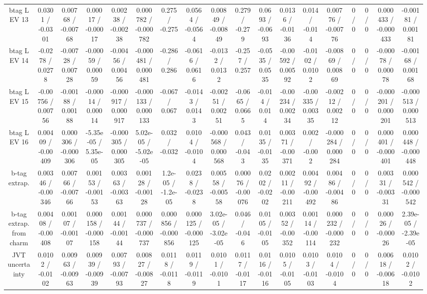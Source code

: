 \documentclass[10pt]{article}
\begin{document}
\begin{table}[htbp]
\begin{center}
\begin{tabular}{|c|c|c|c|c|c|c|c|c|c|c|c|c|c|c|c|c|c|}
  btag L EV 13 & 0.0301 / -0.0301 & 0.00768 / -0.00768 & 0.00017 / -0.00017 & 0.00238 / -0.00238 & 0.000782 / -0.000782 & 0.275 / -0.275 & 0.0564 / -0.0564 & 0.00849 / -0.00849 & 0.279 / -0.279 & 0.0693 / -0.0693 & 0.0136 / -0.0136 & 0.014 / -0.014 & 0.00776 / -0.00776 & 0 / 0 & 0 / 0 & 0.000433 / -0.000433 & -0.00181 / 0.00181 \\ 
  btag L EV 14 & -0.0278 / 0.0278 & -0.00728 / 0.00728 & -0.00059 / 0.00059 & -0.00456 / 0.00456 & -0.000481 / 0.000481 & -0.286 / 0.286 & -0.0616 / 0.0616 & -0.0132 / 0.0132 & -0.257 / 0.257 & -0.0535 / 0.0535 & -0.00592 / 0.00592 & -0.0102 / 0.0102 & -0.00869 / 0.00869 & 0 / 0 & 0 / 0 & -0.00078 / 0.00078 & -0.00168 / 0.00168 \\ 
  btag L EV 15 & -0.00756 / 0.00756 & -0.00188 / 0.00188 & -0.00014 / 0.00014 & -0.000917 / 0.000917 & -0.000133 / 0.000133 & -0.067 / 0.067 & -0.0143 / 0.0143 & -0.00251 / 0.00251 & -0.0665 / 0.0665 & -0.014 / 0.014 & -0.00234 / 0.00234 & -0.00335 / 0.00335 & -0.00212 / 0.00212 & 0 / 0 & 0 / 0 & -0.000201 / 0.000201 & -0.000513 / 0.000513 \\ 
  btag L EV 16 & 0.00409 / -0.00409 & 0.000306 / -0.000306 & -5.35e-05 / 5.35e-05 & -0.000305 / 0.000305 & 5.02e-05 / -5.02e-05 & 0.032 / -0.032 & 0.0104 / -0.0104 & -0.000568 / 0.000568 & 0.043 / -0.043 & 0.0135 / -0.0135 & 0.00371 / -0.00371 & 0.002 / -0.002 & -0.000284 / 0.000284 & 0 / 0 & 0 / 0 & 0.000401 / -0.000401 & 0.000448 / -0.000448 \\ 
  b-tag extrap. & 0.00346 / -0.00346 & 0.00766 / -0.00766 & 0.00153 / -0.00153 & 0.00363 / -0.00363 & 0.00128 / -0.00128 & 1.2e-05 / -1.2e-05 & 0.0238 / -0.0238 & 0.00558 / -0.00558 & 0.00076 / -0.00076 & 0.0202 / -0.0202 & 0.00211 / -0.00211 & 0.00492 / -0.00492 & 0.00486 / -0.00486 & 0 / 0 & 0 / 0 & 0.00331 / -0.00331 & 0.000542 / -0.000542 \\ 
  b-tag extrap. from charm & 0.00408 / -0.00408 & 0.00107 / -0.00107 & 0.000158 / -0.000158 & 0.00144 / -0.00144 & 0.000737 / -0.000737 & 0.000856 / -0.000856 & 0.000125 / -0.000125 & 3.02e-05 / -3.02e-05 & 0.046 / -0.046 & 0.0105 / -0.0105 & 0.00352 / -0.00352 & 0.00114 / -0.00114 & 0.000232 / -0.000232 & 0 / 0 & 0 / 0 & 0.00026 / -0.00026 & 2.39e-05 / -2.39e-05 \\ 
  JVT uncertainty & 0.0102 / -0.0102 & 0.00963 / -0.00963 & 0.00939 / -0.00939 & 0.00793 / -0.00793 & 0.00827 / -0.00827 & 0.0118 / -0.0118 & 0.0119 / -0.0119 & 0.0101 / -0.0101 & 0.0117 / -0.0117 & 0.0116 / -0.0116 & 0.0105 / -0.0105 & 0.0103 / -0.0103 & 0.0104 / -0.0104 & 0 / 0 & 0 / 0 & 0.00618 / -0.00618 & 0.0102 / -0.0102 \\ 

\end{tabular}
\end{center}
\end{table}
\end{document}
